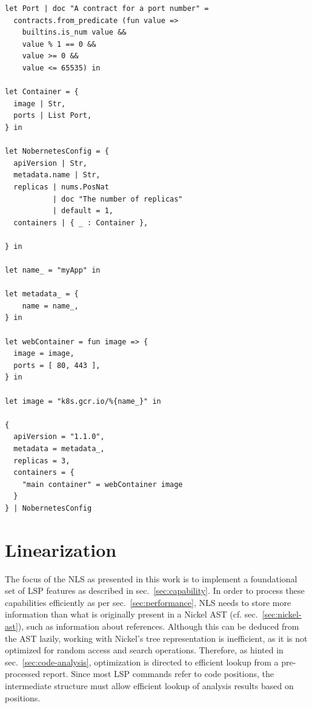 \documentclass[
  a4paper,
  bibtex,
  english,
  nomenclature]{kthlatex/kththesis/kththesis}
\begin{document}
\begin{codelisting}

\caption{Nickel example with most features shown}

\hypertarget{lst:nickel-complete-example}{%
\label{lst:nickel-complete-example}}%
\begin{verbatim}
let Port | doc "A contract for a port number" =
  contracts.from_predicate (fun value =>
    builtins.is_num value &&
    value % 1 == 0 &&
    value >= 0 &&
    value <= 65535) in

let Container = {
  image | Str,
  ports | List Port,
} in

let NobernetesConfig = {
  apiVersion | Str,
  metadata.name | Str,
  replicas | nums.PosNat
           | doc "The number of replicas"
           | default = 1,
  containers | { _ : Container },

} in

let name_ = "myApp" in

let metadata_ = {
    name = name_,
} in

let webContainer = fun image => {
  image = image,
  ports = [ 80, 443 ],
} in

let image = "k8s.gcr.io/%{name_}" in

{
  apiVersion = "1.1.0",
  metadata = metadata_,
  replicas = 3,
  containers = {
    "main container" = webContainer image
  }
} | NobernetesConfig
\end{verbatim}

\end{codelisting}

\hypertarget{sec:linearization}{%
\section{Linearization}\label{sec:linearization}}

The focus of the NLS as presented in this work is to implement a
foundational set of LSP features as described in
sec.~\ref{sec:capability}. In order to process these capabilities
efficiently as per sec.~\ref{sec:performance}, NLS needs to store more
information than what is originally present in a Nickel AST (cf.
sec.~\ref{sec:nickel-ast}), such as information about references.
Although this can be deduced from the AST lazily, working with Nickel's
tree representation is inefficient, as it is not optimized for random
access and search operations. Therefore, as hinted in
sec.~\ref{sec:code-analysis}, optimization is directed to efficient
lookup from a pre-processed report. Since most LSP commands refer to
code positions, the intermediate structure must allow efficient lookup
of analysis results based on positions.
\end{document}
